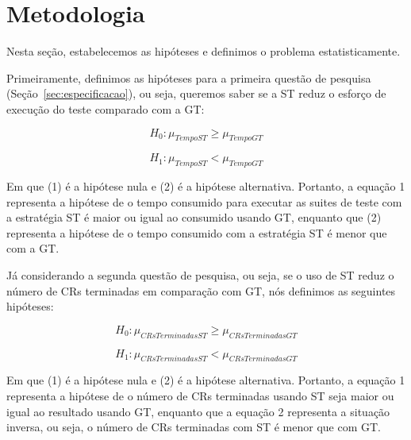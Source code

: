 \section{Metodologia}
\label{sec:metodologia}




Nesta seção, estabelecemos as hipóteses e definimos o problema estatisticamente.

Primeiramente, definimos as hipóteses para a primeira questão de pesquisa (Seção~\ref{sec:especificacao}), ou seja, queremos saber se a ST reduz o esforço de execução do teste comparado com a GT:

\begin{equation}
	H_{0} : \mu_{TempoST} \geq \mu_{TempoGT}
\end{equation}

\begin{equation}
	H_{1} : \mu_{TempoST} < \mu_{TempoGT}
\end{equation}

Em que (1) é a hipótese nula e (2) é a hipótese alternativa. Portanto, a equação 1 representa a hipótese de o tempo consumido para executar as suites de teste com a estratégia ST é maior ou igual ao consumido usando GT, enquanto que (2) representa a hipótese de o tempo consumido com a estratégia ST é menor que com a GT.

Já considerando a segunda questão de pesquisa, ou seja, se o uso de ST reduz o número de CRs terminadas em comparação com GT, nós definimos as seguintes hipóteses:

\begin{equation}
	H_{0} : \mu_{CRsTerminadasST} \geq \mu_{CRsTerminadasGT}
\end{equation}

\begin{equation}
	H_{1} : \mu_{CRsTerminadasST} < \mu_{CRsTerminadasGT}
\end{equation}

Em que (1) é a hipótese nula e (2) é a hipótese alternativa. Portanto, a equação 1 representa a hipótese de o número de CRs terminadas usando ST seja maior ou igual ao resultado usando GT, enquanto que a equação 2 representa a situação inversa, ou seja, o número de CRs terminadas com ST é menor que com GT.



